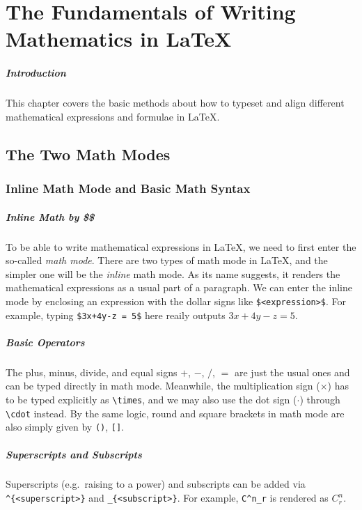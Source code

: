 \chapter{The Fundamentals of Writing Mathematics in \LaTeX{}}

\paragraph{Introduction}
This chapter covers the basic methods about how to typeset and align different mathematical expressions and formulae in \LaTeX{}.

\section{The Two Math Modes}

\subsection{Inline Math Mode and Basic Math Syntax}

\paragraph{Inline Math by \$\$}
To be able to write mathematical expressions in \LaTeX{}, we need to first enter the so-called \textit{math mode}. There are two types of math mode in \LaTeX{}, and the simpler one will be the \textit{inline} math mode. As its name suggests, it renders the mathematical expressions as a usual part of a paragraph. We can enter the inline mode by enclosing an expression with the dollar signs like \texttt{\$<expression>\$}. For example, typing \texttt{\$3x+4y-z = 5\$} here reaily outputs $3x+4y-z = 5$.

\paragraph{Basic Operators}
The plus, minus, divide, and equal signs $+$, $-$, $/$, $=$ are just the usual ones and can be typed directly in math mode. Meanwhile, the multiplication sign ($\times$) has to be typed explicitly as \texttt{\textbackslash times}, and we may also use the dot sign ($\cdot$) through \texttt{\textbackslash cdot} instead. By the same logic, round and square brackets in math mode are also simply given by \texttt{()}, \texttt{[]}.

\paragraph{Superscripts and Subscripts}
Superscripts (e.g.\ raising to a power) and subscripts can be added via \texttt{\^{}\{<superscript>\}} and \texttt{\_\{<subscript>\}}. For example, \verb|C^n_r| is rendered as $C^n_r$.


